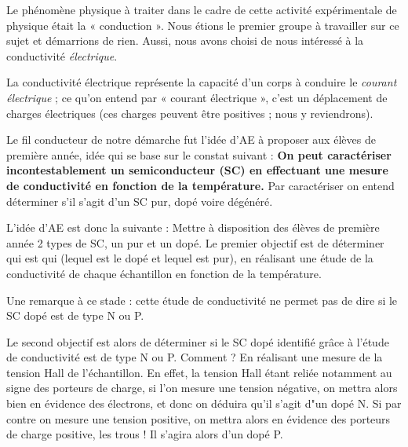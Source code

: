 Le phénomène physique à traiter dans le cadre de cette activité expérimentale de physique était la « conduction ». 
Nous étions le premier groupe à travailler sur ce sujet et démarrions de rien. 
Aussi, nous avons choisi de nous intéressé à la conductivité \textit{électrique}.

La conductivité électrique représente la capacité d'un corps à conduire le \textit{courant électrique} ; 
ce qu'on entend par « courant électrique », c'est un déplacement de charges électriques 
(ces charges peuvent être positives ; nous y reviendrons).

\bigskip
Le fil conducteur de notre démarche fut l'idée d'AE à proposer aux élèves de première année, 
idée qui se base sur le constat suivant :
\textbf{On peut caractériser incontestablement un semiconducteur (SC) en effectuant 
une mesure de conductivité en fonction de la température.}
Par caractériser on entend déterminer s'il s'agit d'un SC pur, dopé voire dégénéré.

\bigskip
L'idée d'AE est donc la suivante :
Mettre à disposition des élèves de première année 2 types de SC, un pur et un dopé. 
Le premier objectif est de déterminer qui est qui (lequel est le dopé et lequel est pur), 
en réalisant une étude de la conductivité de chaque échantillon 
en fonction de la température.

Une remarque à ce stade : cette étude de conductivité ne permet pas de dire si le SC dopé est de type N ou P.

Le second objectif est alors de déterminer si le SC dopé identifié grâce à l'étude de 
conductivité est de type N ou P.
Comment ? En réalisant une mesure de la tension Hall de l'échantillon.
En effet, la tension Hall étant reliée notamment au signe des porteurs de charge, si l'on mesure une tension négative, 
on mettra alors bien en évidence des électrons, et donc on déduira qu'il s'agit d"un dopé N.
Si par contre on mesure une tension positive, on mettra alors en évidence des porteurs de charge positive, les trous !
Il s'agira alors d'un dopé P.
